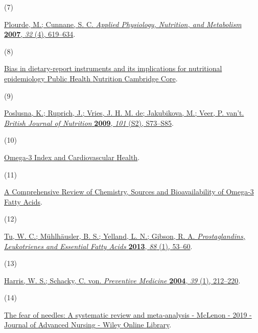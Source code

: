 \documentclass[journal=jacsat,manuscript=article]{achemso}
\newlength{\cslhangindent}
\newlength{\csllabelwidth}
\newenvironment{CSLReferences}[2] %
 {\begin{list}{}{%
  \setlength{\itemindent}{0pt}
  \setlength{\leftmargin}{0pt}
  \setlength{\parsep}{0pt}
  \ifodd #1
   \setlength{\leftmargin}{\cslhangindent}
   \setlength{\itemindent}{-1\cslhangindent}
  \fi
  \setlength{\itemsep}{#2\baselineskip}}}
 {\end{list}}
\newcommand{\CSLLeftMargin}[1]{\parbox[t]{\csllabelwidth}{#1}}
\newcommand{\CSLRightInline}[1]{\parbox[t]{\linewidth - \csllabelwidth}{#1}\break}
\begin{document}
\begin{CSLReferences}{0}{0}
\CSLLeftMargin{(7) }%
\CSLRightInline{\href{https://doi.org/10.1139/H07-034}{Plourde, M.;
Cunnane, S. C. \emph{Applied Physiology, Nutrition, and Metabolism}
\textbf{2007}, \emph{32} (4), 619--634}.}

\CSLLeftMargin{(8) }%
\CSLRightInline{\href{https://www.cambridge.org/core/journals/public-health-nutrition/article/bias-in-dietaryreport-instruments-and-its-implications-for-nutritional-epidemiology/F74F7C0AF47FDD40061A3684DA658731}{Bias
in dietary-report instruments and its implications for nutritional
epidemiology {\textbar} {Public} {Health} {Nutrition} {\textbar}
{Cambridge} {Core}}.}

\CSLLeftMargin{(9) }%
\CSLRightInline{\href{https://doi.org/10.1017/S0007114509990602}{Poslusna,
K.; Ruprich, J.; Vries, J. H. M. de; Jakubikova, M.; Veer, P. van't.
\emph{British Journal of Nutrition} \textbf{2009}, \emph{101} (S2),
S73--S85}.}

\CSLLeftMargin{(10) }%
\CSLRightInline{\href{https://www.mdpi.com/2072-6643/6/2/799?uid=563b4f0a2a}{Omega-3
{Index} and {Cardiovascular} {Health}}.}

\CSLLeftMargin{(11) }%
\CSLRightInline{\href{https://www.mdpi.com/2072-6643/10/11/1662}{A
{Comprehensive} {Review} of {Chemistry}, {Sources} and {Bioavailability}
of {Omega}-3 {Fatty} {Acids}}.}

\CSLLeftMargin{(12) }%
\CSLRightInline{\href{https://doi.org/10.1016/j.plefa.2012.04.005}{Tu,
W. C.; Mühlhäusler, B. S.; Yelland, L. N.; Gibson, R. A.
\emph{Prostaglandins, Leukotrienes and Essential Fatty Acids}
\textbf{2013}, \emph{88} (1), 53--60}.}

\CSLLeftMargin{(13) }%
\CSLRightInline{\href{https://doi.org/10.1016/j.ypmed.2004.02.030}{Harris,
W. S.; Schacky, C. von. \emph{Preventive Medicine} \textbf{2004},
\emph{39} (1), 212--220}.}

\CSLLeftMargin{(14) }%
\CSLRightInline{\href{https://onlinelibrary.wiley.com/doi/full/10.1111/jan.13818}{The
fear of needles: {A} systematic review and meta‐analysis - {McLenon} -
2019 - {Journal} of {Advanced} {Nursing} - {Wiley} {Online} {Library}}.}


\end{CSLReferences}
\end{document}
